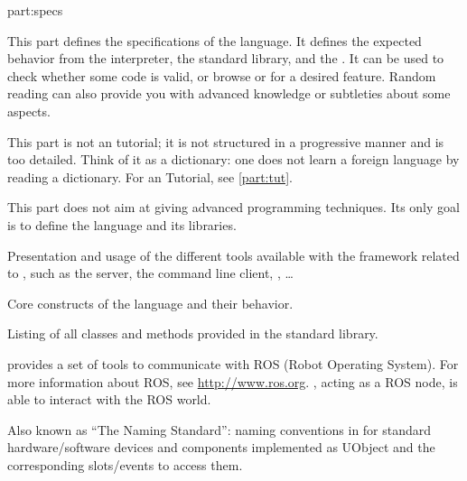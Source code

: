 
\begin{partDescription}{part:specs}
  {
    This part defines the specifications of the \us language. It defines the
    expected behavior from the \us interpreter, the standard library, and
    the \sdk. It can be used to check whether some code is valid, or browse
    \us or \Cxx \api for a desired feature. Random reading can also provide
    you with advanced knowledge or subtleties about some \us aspects.

    This part is not an \us tutorial; it is not structured in a progressive
    manner and is too detailed.  Think of it as a dictionary: one does not
    learn a foreign language by reading a dictionary. For an \us Tutorial,
    see \autoref{part:tut}.

    This part does not aim at giving advanced programming techniques. Its
    only goal is to define the language and its libraries.
  }
\item[sec:tools] Presentation and usage of the different tools available
  with the \urbi framework related to \us, such as the \urbi server, the
  command line client, \umake, \ldots

\item[sec:lang] Core constructs of the language and their behavior.

\item[sec:stdlib] Listing of all classes and methods provided in the
  standard library.

\item[sec:specs:ros] \urbi provides a set of tools to communicate with ROS
  (Robot Operating System). For more information about ROS, see
  \url{http://www.ros.org}.  \urbi, acting as a ROS node, is able to
  interact with the ROS world.

\item[sec:naming] Also known as ``The \urbi Naming Standard'': naming
  conventions in for standard hardware/software devices and components
  implemented as UObject and the corresponding slots/events to access them.

\end{partDescription}


